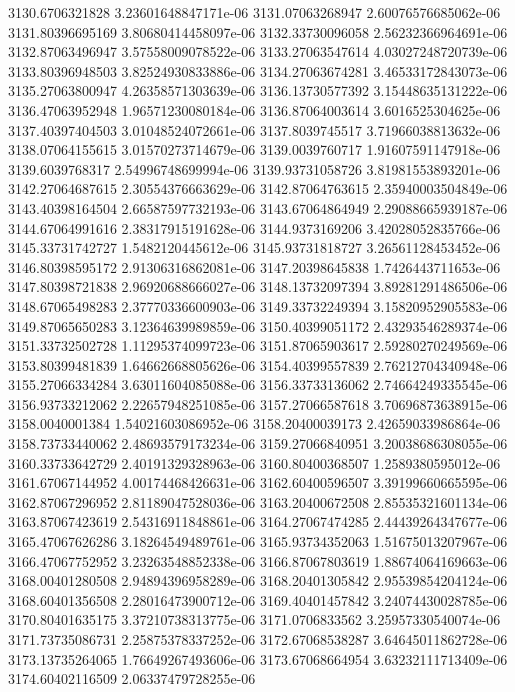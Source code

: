 {3130.6706321828 3.23601648847171e-06
3131.07063268947 2.60076576685062e-06
3131.80396695169 3.80680414458097e-06
3132.33730096058 2.56232366964691e-06
3132.87063496947 3.57558009078522e-06
3133.27063547614 4.03027248720739e-06
3133.80396948503 3.82524930833886e-06
3134.27063674281 3.46533172843073e-06
3135.27063800947 4.26358571303639e-06
3136.13730577392 3.15448635131222e-06
3136.47063952948 1.96571230080184e-06
3136.87064003614 3.6016525304625e-06
3137.40397404503 3.01048524072661e-06
3137.8039745517 3.71966038813632e-06
3138.07064155615 3.01570273714679e-06
3139.0039760717 1.91607591147918e-06
3139.6039768317 2.54996748699994e-06
3139.93731058726 3.81981553893201e-06
3142.27064687615 2.30554376663629e-06
3142.87064763615 2.35940003504849e-06
3143.40398164504 2.66587597732193e-06
3143.67064864949 2.29088665939187e-06
3144.67064991616 2.38317915191628e-06
3144.9373169206 3.42028052835766e-06
3145.33731742727 1.5482120445612e-06
3145.93731818727 3.26561128453452e-06
3146.80398595172 2.91306316862081e-06
3147.20398645838 1.7426443711653e-06
3147.80398721838 2.96920688666027e-06
3148.13732097394 3.89281291486506e-06
3148.67065498283 2.37770336600903e-06
3149.33732249394 3.15820952905583e-06
3149.87065650283 3.12364639989859e-06
3150.40399051172 2.43293546289374e-06
3151.33732502728 1.11295374099723e-06
3151.87065903617 2.59280270249569e-06
3153.80399481839 1.64662668805626e-06
3154.40399557839 2.76212704340948e-06
3155.27066334284 3.63011604085088e-06
3156.33733136062 2.74664249335545e-06
3156.93733212062 2.22657948251085e-06
3157.27066587618 3.70696873638915e-06
3158.0040001384 1.54021603086952e-06
3158.20400039173 2.42659033986864e-06
3158.73733440062 2.48693579173234e-06
3159.27066840951 3.20038686308055e-06
3160.33733642729 2.40191329328963e-06
3160.80400368507 1.2589380595012e-06
3161.67067144952 4.00174468426631e-06
3162.60400596507 3.39199660665595e-06
3162.87067296952 2.81189047528036e-06
3163.20400672508 2.85535321601134e-06
3163.87067423619 2.54316911848861e-06
3164.27067474285 2.44439264347677e-06
3165.47067626286 3.18264549489761e-06
3165.93734352063 1.51675013207967e-06
3166.47067752952 3.23263548852338e-06
3166.87067803619 1.88674064169663e-06
3168.00401280508 2.94894396958289e-06
3168.20401305842 2.95539854204124e-06
3168.60401356508 2.28016473900712e-06
3169.40401457842 3.24074430028785e-06
3170.80401635175 3.37210738313775e-06
3171.0706833562 3.25957330540074e-06
3171.73735086731 2.25875378337252e-06
3172.67068538287 3.64645011862728e-06
3173.13735264065 1.76649267493606e-06
3173.67068664954 3.63232111713409e-06
3174.60402116509 2.06337479728255e-06
}
